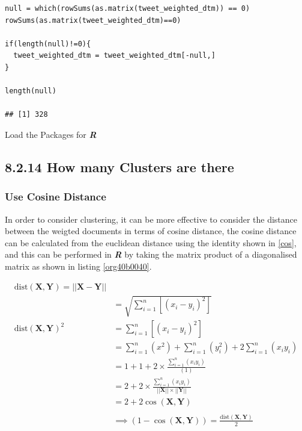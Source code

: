 \documentclass[11pt]{article}
\begin{document}
\begin{listing}[htbp]
\begin{verbatim}
null = which(rowSums(as.matrix(tweet_weighted_dtm)) == 0)
rowSums(as.matrix(tweet_weighted_dtm)==0)

if(length(null)!=0){
  tweet_weighted_dtm = tweet_weighted_dtm[-null,]
}

length(null)

## [1] 328
\end{verbatim}
\caption{\label{org22bb508}Load the Packages for \textbf{\textbf{\emph{R}}}}
\end{listing}
\subsection{8.2.14 How many Clusters are there}
\label{sec:orgb7c1130}
\subsubsection{Use Cosine Distance}
\label{sec:orgb96a7dd}
In order to consider clustering, it can be more effective to consider the distance between the weigted documents in terms of cosine distance, the cosine distance can be calculated from the euclidean distance using the identity shown in \eqref{cos}, and this can be performed in \textbf{\emph{R}} by taking the matrix product of a diagonalised matrix as shown in listing \ref{org40b0040}.

\begin{align}
\mathrm{dist}\left( \mathbf{X}, \mathbf{Y} \right)= \left| \left| \mathbf{X}-\mathbf{Y} \right| \right| \\
&= \sqrt{\sum^{n}_{i= 1}   \left[ \left( x_i-y_i \right)^2 \right] } \\
\mathrm{dist}\left( \mathbf{X}, \mathbf{Y} \right)^2&= \sum^{n}_{i= 1}  \left[ \left( x_i-y_i \right)^2 \right] \\
&= \sum^{n}_{i= 1}   \left( x^2 \right)+  \sum^{n}_{i= 1}   \left( y_i^2 \right)+ 2 \sum^{n}_{i= 1}   \left( x_iy_i \right) \\
&= 1+ 1 +  2 \times  \frac{\sum^{n}_{i= 1}   \left( x_iy_i \right)}{\left( 1 \right) }\\
&= 2+ 2\times \frac{\sum^{n}_{i= 1}   \left( x_iy_i \right)}{\left| \left| \mathbf{X} \right| \right|\times \left| \left| \mathbf{Y} \right| \right|}\\
&= 2+ 2 \cos\left( \mathbf{X}, \mathbf{Y} \right)\\
\ \\
& \implies  \left( 1- \cos\left( \mathbf{X}, \mathbf{Y} \right) \right) = \frac{\mathrm{dist}\left( \mathbf{X}, \mathbf{Y} \right)}{2} \label{cos}
\end{align}
\end{document}
